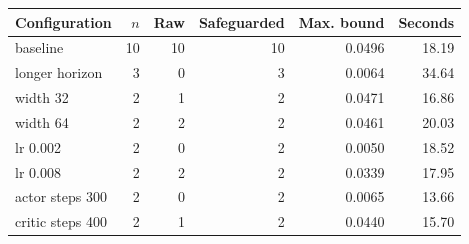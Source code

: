 \begin{tabular}{lrrrrr}
\toprule
Configuration & $n$ & Raw & Safeguarded & Max. bound & Seconds \\
\midrule
baseline & 10 & 10 & 10 & 0.0496 & 18.19 \\
longer horizon & 3 & 0 & 3 & 0.0064 & 34.64 \\
width 32 & 2 & 1 & 2 & 0.0471 & 16.86 \\
width 64 & 2 & 2 & 2 & 0.0461 & 20.03 \\
lr 0.002 & 2 & 0 & 2 & 0.0050 & 18.52 \\
lr 0.008 & 2 & 2 & 2 & 0.0339 & 17.95 \\
actor steps 300 & 2 & 0 & 2 & 0.0065 & 13.66 \\
critic steps 400 & 2 & 1 & 2 & 0.0440 & 15.70 \\
\bottomrule
\end{tabular}
